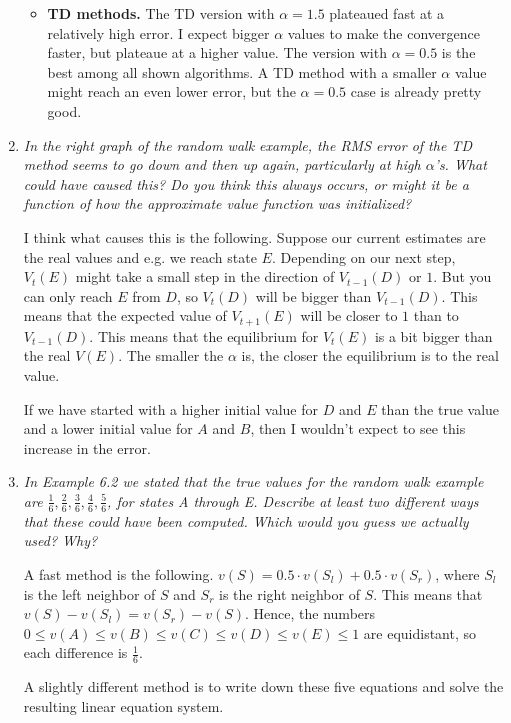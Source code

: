 \documentclass[12pt,a4paper]{article}
\begin{document}
\begin{enumerate}
\begin{itemize}
\item \textbf{TD methods.}
The TD version with $\alpha = 1.5$ plateaued fast at a relatively high error. I expect
bigger $\alpha$ values to make the convergence faster, but plateaue at a higher value.
The version with $\alpha = 0.5$ is the best among all shown algorithms. A TD method with a smaller
$\alpha$ value might reach an even lower error, but the $\alpha = 0.5$ case is already pretty good.
\end{itemize}

\item
\textit{In the right graph of the random walk example, the RMS error of the
TD method seems to go down and then up again, particularly at high $\alpha$’s. What could
have caused this? Do you think this always occurs, or might it be a function of how the
approximate value function was initialized?}

I think what causes this is the following. Suppose our current estimates are the real values and e.g.
we reach state $E$. Depending on our next step, $V_t(E)$ might take a small step in
the direction of $V_{t - 1}(D)$ or $1$. But you can only reach $E$ from $D$,
so $V_t(D)$ will be bigger than $V_{t - 1}(D)$. This means that the expected value
of $V_{t + 1}(E)$ will be closer to $1$ than to $V_{t - 1}(D)$. This means that the
equilibrium for $V_t(E)$ is a bit bigger than the real $V(E)$. The smaller
the $\alpha$ is, the closer the equilibrium is to the real value.

If we have started with a higher initial value for $D$ and $E$ than the true value
and a lower initial value for $A$ and $B$, then I wouldn't expect to see this increase
in the error.

\item
\textit{In Example 6.2 we stated that the true values for the random walk example are
$\frac{1}{6}, \frac{2}{6}, \frac{3}{6}, \frac{4}{6}, \frac{5}{6}$, for states A through E.
Describe at least two different ways that these could have been computed. Which would
you guess we actually used? Why?}

A fast method is the following. $v(S) = 0.5 \cdot v(S_l) + 0.5 \cdot v(S_r)$, where $S_l$ is the
left neighbor of $S$ and $S_r$ is the right neighbor of $S$. This means that $v(S) - v(S_l) = v(S_r) - v(S)$. Hence, the numbers $0 \le v(A) \le v(B) \le v(C) \le v(D) \le v(E) \le 1$ are equidistant, so
each difference is $\frac{1}{6}$.

A slightly different method is to write down these five equations and solve the resulting
linear equation system.


\end{enumerate}
\end{document}
